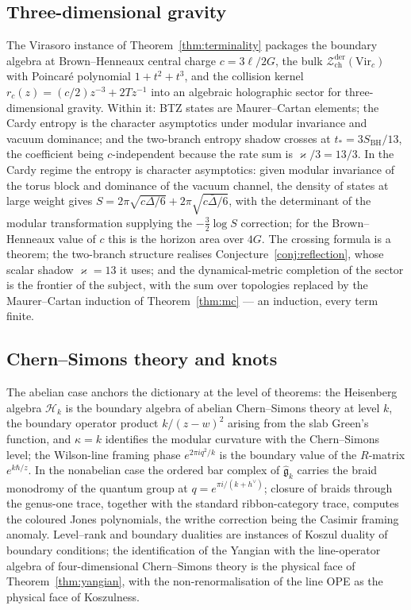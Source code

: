 \documentclass[11pt]{amsart}
\numberwithin{equation}{section}
\theoremstyle{plain}
\theoremstyle{definition}
\theoremstyle{remark}
\newcommand{\cZ}{\mathcal{Z}}
\newcommand{\fg}{\mathfrak{g}}
\newcommand{\Vir}{\mathrm{Vir}}
\newcommand{\dvee}{h^{\vee}}
\begin{document}
\subsection{Three-dimensional gravity}

The Virasoro instance of Theorem~\ref{thm:terminality} packages the
boundary algebra at Brown--Henneaux central charge $c=3\ell/2G$, the
bulk $\cZ^{\mathrm{der}}_{\mathrm{ch}}(\Vir_c)$ with Poincar\'e
polynomial $1+t^{2}+t^{3}$, and the collision kernel
$r_c(z)=(c/2)z^{-3}+2Tz^{-1}$ into an algebraic holographic sector for
three-dimensional gravity. Within it: BTZ states are Maurer--Cartan
elements; the Cardy entropy is the character asymptotics under modular
invariance and vacuum dominance; and the two-branch entropy shadow
crosses at $t_{*}=3S_{\mathrm{BH}}/13$, the coefficient being
$c$-independent because the rate sum is $\varkappa/3=13/3$. In the Cardy regime the entropy is character asymptotics: given
modular invariance of the torus block and dominance of the vacuum
channel, the density of states at large weight gives
$S=2\pi\sqrt{c\Delta/6}+2\pi\sqrt{c\bar\Delta/6}$, with the
determinant of the modular transformation supplying the
$-\tfrac32\log S$ correction; for the Brown--Henneaux value of $c$
this is the horizon area over $4G$. The
crossing formula is a theorem; the two-branch structure realises
Conjecture~\ref{conj:reflection}, whose scalar shadow
$\varkappa=13$ it uses; and the dynamical-metric completion of the
sector is the frontier of the subject, with the sum over topologies
replaced by the Maurer--Cartan induction of Theorem~\ref{thm:mc} ---
an induction, every term finite.

\subsection{Chern--Simons theory and knots}

The abelian case anchors the dictionary at the level of theorems: the
Heisenberg algebra $\mathcal{H}_k$ is the boundary algebra of abelian
Chern--Simons theory at level $k$, the boundary operator product
$k/(z-w)^{2}$ arising from the slab Green's function, and
$\kappa=k$ identifies the modular curvature with the Chern--Simons
level; the Wilson-line framing phase $e^{2\pi iq^{2}/k}$ is the
boundary value of the $R$-matrix $e^{k\hbar/z}$. In the nonabelian
case the ordered bar complex of $\widehat{\fg}_k$ carries the braid
monodromy of the quantum group at $q=e^{\pi i/(k+\dvee)}$; closure of
braids through the genus-one trace, together with the standard
ribbon-category trace, computes the coloured Jones polynomials, the
writhe correction being the Casimir framing anomaly. Level--rank and
boundary dualities are instances of Koszul duality of boundary
conditions; the identification of the Yangian with the line-operator
algebra of four-dimensional Chern--Simons theory \cite{CWY} is the
physical face of Theorem~\ref{thm:yangian}, with the
non-renormalisation of the line OPE as the physical face of
Koszulness.
\end{document}
